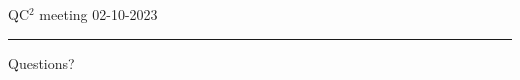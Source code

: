 \documentclass{beamer}
\def\lbt{\small QC$^2$ meeting 02-10-2023} %
\newenvironment{dia}[2]
{
	\begin{frame}
	\vspace{1mm}
	{\small #1}
	\hfill
    {\small\bf\textcolor{blue}{#2}}
	\vspace{3mm}
	\hrule
	\bigskip
}
{
	\vfill
	\end{frame}
}
\begin{document}
\begin{dia}{\lbt}{}
\vspace{2.5cm}
\begin{center}
\begin{LARGE}
\textcolor{mygreen}{Questions?}
\end{LARGE}
\end{center}
\vspace*{1.5cm}
\end{dia}
\end{document}
